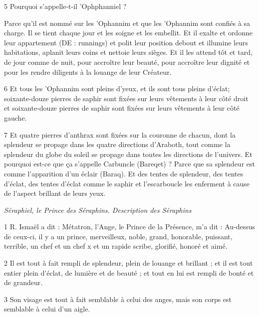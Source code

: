 \par 5 Pourquoi s'appelle-t-il 'Ophphanniel ?

\par Parce qu'il est nommé sur les 'Ophannim et que les 'Ophannim sont confiés à sa charge. Il se tient chaque jour et les soigne et les embellit. Et il exalte et ordonne leur appartement (DE : runnings) et polit leur position debout et illumine leurs habitations, aplanit leurs coins et nettoie leurs sièges. Et il les attend tôt et tard, de jour comme de nuit, pour accroître leur beauté, pour accroître leur dignité et pour les rendre diligents à la louange de leur Créateur.

\par 6 Et tous les 'Ophannim sont pleins d'yeux, et ils sont tous pleins d'éclat; soixante-douze pierres de saphir sont fixées sur leurs vêtements à leur côté droit et soixante-douze pierres de saphir sont fixées sur leurs vêtements à leur côté gauche.

\par 7 Et quatre pierres d'anthrax sont fixées sur la couronne de chacun, dont la splendeur se propage dans les quatre directions d'Araboth, tout comme la splendeur du globe du soleil se propage dans toutes les directions de l'univers. Et pourquoi est-ce que ça s'appelle Carbuncle (Bareqet) ? Parce que sa splendeur est comme l’apparition d’un éclair (Baraq). Et des tentes de splendeur, des tentes d'éclat, des tentes d'éclat comme le saphir et l'escarboucle les enferment à cause de l'aspect brillant de leurs yeux.


\par \textit{Séraphiel, le Prince des Séraphins. Description des Séraphins}

\par 1 R. Ismaël a dit : Métatron, l'Ange, le Prince de la Présence, m'a dit : Au-dessus de ceux-ci, il y a un prince, merveilleux, noble, grand, honorable, puissant, terrible, un chef et un chef x et un rapide scribe, glorifié, honoré et aimé.

\par 2 Il est tout à fait rempli de splendeur, plein de louange et brillant ; et il est tout entier plein d'éclat, de lumière et de beauté ; et tout en lui est rempli de bonté et de grandeur.

\par 3 Son visage est tout à fait semblable à celui des anges, mais son corps est semblable à celui d'un aigle.

